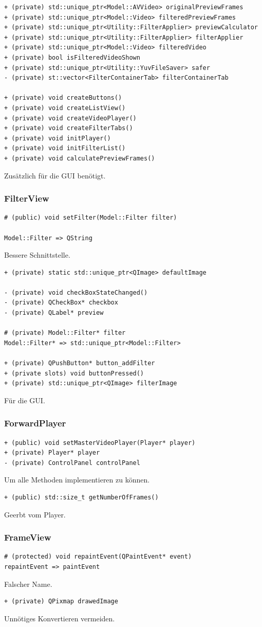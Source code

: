 \documentclass{scrartcl}
\begin{document}
{\begin{verbatim}
+ (private) std::unique_ptr<Model::AVVideo> originalPreviewFrames
+ (private) std::unique_ptr<Model::Video> filteredPreviewFrames
+ (private) std::unique_ptr<Utility::FilterApplier> previewCalculator
+ (private) std::unique_ptr<Utility::FilterApplier> filterApplier
+ (private) std::unique_ptr<Model::Video> filteredVideo
+ (private) bool isFilteredVideoShown
+ (private) std::unique_ptr<Utility::YuvFileSaver> safer
- (private) st::vector<FilterContainerTab> filterContainerTab

+ (private) void createButtons()
+ (private) void createListView()
+ (private) void createVideoPlayer()
+ (private) void createFilterTabs()
+ (private) void initPlayer()
+ (private) void initFilterList()
+ (private) void calculatePreviewFrames()
\end{verbatim}
Zusätzlich für die GUI benötigt.
\newpage
\subsubsection{FilterView}
\begin{verbatim}
# (public) void setFilter(Model::Filter filter)

Model::Filter => QString
\end{verbatim}
Bessere Schnittstelle.
\bigskip
\begin{verbatim}
+ (private) static std::unique_ptr<QImage> defaultImage

- (private) void checkBoxStateChanged()
- (private) QCheckBox* checkbox
- (private) QLabel* preview

# (private) Model::Filter* filter
Model::Filter* => std::unique_ptr<Model::Filter>

+ (private) QPushButton* button_addFilter
+ (private slots) void buttonPressed()
+ (private) std::unique_ptr<QImage> filterImage
\end{verbatim}
Für die GUI.
\bigskip
\subsubsection{ForwardPlayer}
\bigskip
\begin{verbatim}
+ (public) void setMasterVideoPlayer(Player* player)
+ (private) Player* player
- (private) ControlPanel controlPanel
\end{verbatim}
Um alle Methoden implementieren zu können.
\bigskip
\begin{verbatim}
+ (public) std::size_t getNumberOfFrames()
\end{verbatim}
Geerbt vom Player.
\bigskip
\subsubsection{FrameView}
\begin{verbatim}
# (protected) void repaintEvent(QPaintEvent* event)
repaintEvent => paintEvent
\end{verbatim}
Falscher Name.
\bigskip
\begin{verbatim}
+ (private) QPixmap drawedImage
\end{verbatim}
Unnötiges Konvertieren vermeiden.
\bigskip
}
\end{document}
